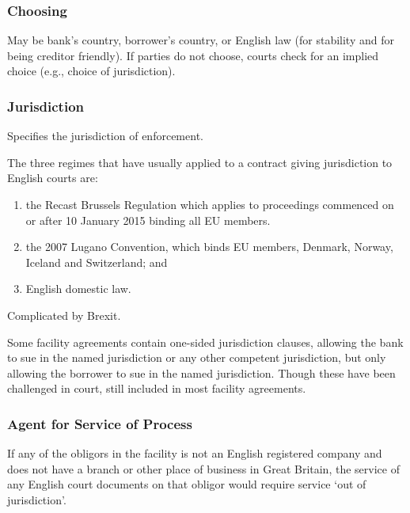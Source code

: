\documentclass[
]{article}
\providecommand{\tightlist}{%
  \setlength{\itemsep}{0pt}\setlength{\parskip}{0pt}}
\begin{document}
\hypertarget{choosing}{%
\subsubsection{Choosing}\label{choosing}}

May be bank's country, borrower's country, or English law (for stability
and for being creditor friendly). If parties do not choose, courts check
for an implied choice (e.g., choice of jurisdiction).

\hypertarget{jurisdiction}{%
\subsubsection{Jurisdiction}\label{jurisdiction}}

Specifies the jurisdiction of enforcement.

The three regimes that have usually applied to a contract giving
jurisdiction to English courts are:

\begin{enumerate}
\tightlist
\item
  the Recast Brussels Regulation which applies to proceedings commenced
  on or after 10 January 2015 binding all EU members.
\item
  the 2007 Lugano Convention, which binds EU members, Denmark, Norway,
  Iceland and Switzerland; and
\item
  English domestic law.
\end{enumerate}

Complicated by Brexit.

Some facility agreements contain one-sided jurisdiction clauses,
allowing the bank to sue in the named jurisdiction or any other
competent jurisdiction, but only allowing the borrower to sue in the
named jurisdiction. Though these have been challenged in court, still
included in most facility agreements.

\hypertarget{agent-for-service-of-process}{%
\subsubsection{Agent for Service of
Process}\label{agent-for-service-of-process}}

If any of the obligors in the facility is not an English registered
company and does not have a branch or other place of business in Great
Britain, the service of any English court documents on that obligor
would require service `out of jurisdiction'.
\end{document}
